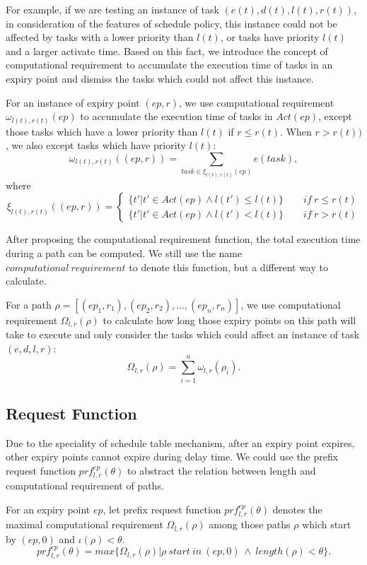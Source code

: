 \documentclass[sigconf]{acmart}
\begin{document}
For example, if we are testing an instance of task $(e(t),d(t),l(t),r(t))$, in consideration of the features of schedule policy, this instance could not be affected by tasks with a lower priority than $l(t)$, or tasks have priority $l(t)$ and a larger activate time. Based on this fact, we introduce the concept of computational requirement to accumulate the execution time of tasks in an expiry point and dismiss the tasks which could not affect this instance.
\begin{definition}
For an instance of expiry point $(ep,r)$, we use computational requirement $\omega_{l(t),r(t)}(ep)$ to accumulate the execution time of tasks in $Act(ep)$, except those tasks which have a lower priority than $l(t)$ if $r\leq r(t)$. When $r>r(t))$, we also except tasks which have priority $l(t)$:
\begin{equation}
\omega_{l(t),r(t)}((ep,r))=\sum\limits_{task\in \xi_{l(t),r(t)}(ep)}e(task),
\end{equation}\label{equation_loweromega}
where 
\[
\xi_{l(t),r(t)}((ep,r))=\begin{cases}\{t'|t'\in Act(ep)\wedge l(t')\leq l(t)\}\qquad if\ r\leq r(t)\\
\{t'|t'\in Act(ep)\wedge l(t')<l(t)\}\qquad if\ r>r(t)
\end{cases}\]
\end{definition}
After proposing the computational requirement function, the total execution time during a path can be computed. We still use the name $computational\ requirement$ to denote this function, but a different way to calculate.
\begin{definition}
For a path $\rho=[(ep_1,r_1),(ep_2,r_2),\dots,(ep_n,r_n)]$, we use computational requirement $\Omega_{l,r}(\rho)$ to calculate how long those expiry points on this path will take to execute and only consider the tasks which could affect an instance of task $(e,d,l,r)$:
\begin{equation}
\Omega_{l,r}(\rho)=\sum_{i=1}^n\omega_{l,r}(\rho_i).
\end{equation}\label{equation_higheromega}
\end{definition}

\subsection{Request Function}\label{section_prf}
Due to the speciality of schedule table mechanism, after an expiry point expires, other expiry points cannot expire during delay time. We could use the prefix request function \cite{DBLP:journals/rts/Stigge015a} $prf^{ep}_{l,r}(\theta)$ to abstract the relation between length and computational requirement of paths.
\begin{definition}
For an expiry point $ep$, let prefix request function $prf^{ep}_{l,r}(\theta)$ denotes the maximal computational requirement $\Omega_{l,r}(\rho)$ among those paths $\rho$ which start by $(ep,0)$ and $\iota(\rho)<\theta$.
\begin{equation}
prf^{ep}_{l,r}(\theta)=max\{\Omega_{l,r}(\rho)|\rho \ start\ in\ (ep,0)\ \wedge\ length(\rho)<\theta\}.
\end{equation}\label{equation_prf}
\end{definition}
\end{document}
